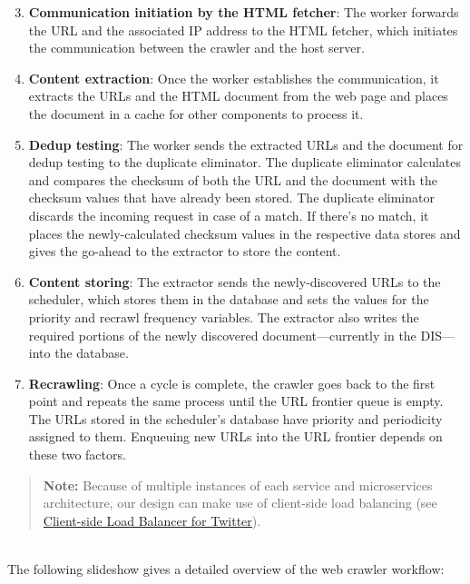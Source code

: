 \begin{enumerate}
\setcounter{enumi}{2}
\item
\protect{}\label{W5_6h6i4sy_yqcXiIfSvX}
\textbf{Communication initiation by the HTML fetcher}: The worker forwards the URL and the associated IP address to the HTML fetcher, which initiates the communication between the crawler and the host server.
\item
\protect{}\label{MxdcjPwcngSSJAtQ-Er_h}
\textbf{Content extraction}: Once the worker establishes the communication, it extracts the URLs and the HTML document from the web page and places the document in a cache for other components to process it.
\item
\protect{}\label{HOS1-V44iL1G_-yGhWY1m}
\textbf{Dedup testing}: The worker sends the extracted URLs and the document for dedup testing to the duplicate eliminator. The duplicate eliminator calculates and compares the checksum of both the URL and the document with the checksum values that have already been stored. The duplicate eliminator discards the incoming request in case of a match. If there's no match, it places the newly-calculated checksum values in the respective data stores and gives the go-ahead to the extractor to store the content.
\item
\protect{}\label{vbCbAr-fpS8yemEyIqIxF}
\textbf{Content storing}: The extractor sends the newly-discovered URLs to the scheduler, which stores them in the database and sets the values for the priority and recrawl frequency variables. The extractor also writes the required portions of the newly discovered document---currently in the DIS---into the database.
\item
\protect{}\label{17IjrFDi97ujJP9phz6Jd}
\textbf{Recrawling}: Once a cycle is complete, the crawler goes back to the first point and repeats the same process until the URL frontier queue is empty.\\
The URLs stored in the scheduler's database have priority and periodicity assigned to them. Enqueuing new URLs into the URL frontier depends on these two factors.
\end{enumerate}
\begin{quote}
\textbf{Note:} Because of multiple instances of each service and microservices architecture, our design can make use of client-side load balancing (see \href{https://www.educative.io/courses/grokking-the-system-design-interview/client-side-load-balancer-for-twitter}{Client-side Load Balancer for Twitter}).
\end{quote}
\\
The following slideshow gives a detailed overview of the web crawler workflow:

